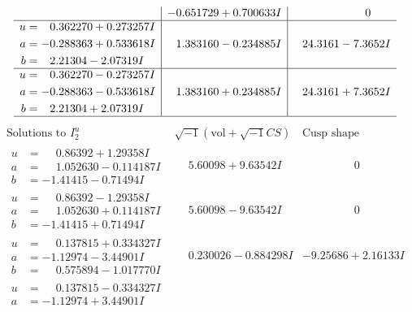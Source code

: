 \documentclass[1p]{elsarticle_modified}
\theoremstyle{definition}
\newcommand{\I}{\sqrt{-1}}
\begin{document}
$$\begin{array}{c|c|c}
 & -0.651729 + 0.700633 I & \phantom{-0.000000 } 0 \\ \hline\begin{aligned}
u &= \phantom{-}0.362270 + 0.273257 I \\
a &= -0.288363 + 0.533618 I \\
b &= \phantom{-}2.21304 - 2.07319 I\end{aligned}
 & \phantom{-}1.383160 - 0.234885 I & \phantom{-}24.3161 - 7.3652 I \\ \hline\begin{aligned}
u &= \phantom{-}0.362270 - 0.273257 I \\
a &= -0.288363 - 0.533618 I \\
b &= \phantom{-}2.21304 + 2.07319 I\end{aligned}
 & \phantom{-}1.383160 + 0.234885 I & \phantom{-}24.3161 + 7.3652 I\\
 \hline 
 \end{array}$$\newpage$$\begin{array}{c|c|c}  
\text{Solutions to }I^u_{2}& \I (\text{vol} + \sqrt{-1}CS) & \text{Cusp shape}\\
 \hline 
\begin{aligned}
u &= \phantom{-}0.86392 + 1.29358 I \\
a &= \phantom{-}1.052630 - 0.114187 I \\
b &= -1.41415 - 0.71494 I\end{aligned}
 & \phantom{-}5.60098 + 9.63542 I & \phantom{-0.000000 } 0 \\ \hline\begin{aligned}
u &= \phantom{-}0.86392 - 1.29358 I \\
a &= \phantom{-}1.052630 + 0.114187 I \\
b &= -1.41415 + 0.71494 I\end{aligned}
 & \phantom{-}5.60098 - 9.63542 I & \phantom{-0.000000 } 0 \\ \hline\begin{aligned}
u &= \phantom{-}0.137815 + 0.334327 I \\
a &= -1.12974 - 3.44901 I \\
b &= \phantom{-}0.575894 - 1.017770 I\end{aligned}
 & \phantom{-}0.230026 - 0.884298 I & -9.25686 + 2.16133 I \\ \hline\begin{aligned}
u &= \phantom{-}0.137815 - 0.334327 I \\
a &= -1.12974 + 3.44901 I \\

\end{aligned}
\end{array}$$
\end{document}
